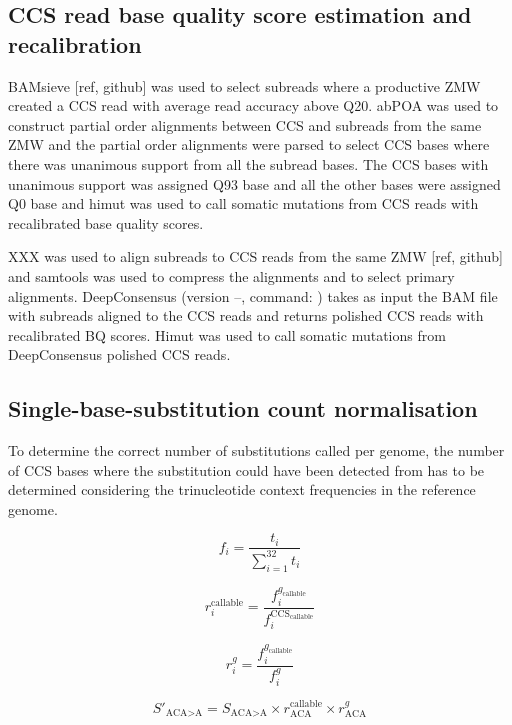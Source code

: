 \subsection{CCS read base quality score estimation and recalibration}

BAMsieve [ref, github] was used to select subreads where a productive ZMW created a CCS read with average read accuracy above Q20. abPOA \cite{Gao2021-nf} was used to construct partial order alignments between CCS and subreads from the same ZMW and the partial order alignments were parsed to select CCS bases where there was unanimous support from all the subread bases. The CCS bases with unanimous support was assigned Q93 base and all the other bases were assigned Q0 base and himut was used to call somatic mutations from CCS reads with recalibrated base quality scores. 

XXX was used to align subreads to CCS reads from the same ZMW [ref, github] and samtools was used to compress the alignments and to select primary alignments. DeepConsensus (version --, command: ) \cite{Baid2022-or} takes as input the BAM file with subreads aligned to the CCS reads and returns polished CCS reads with recalibrated BQ scores. Himut was used to call somatic mutations from DeepConsensus polished CCS reads. 

\subsection{Single-base-substitution count normalisation}
To determine the correct number of substitutions called per genome, the number of CCS bases where the substitution could have been detected from has to be determined considering the trinucleotide context frequencies in the reference genome.

\begin{equation}
f_{i} = \frac{t_{i}}{\sum^{32}_{i=1} t_{i}}
\end{equation}

\begin{equation}
r^{\text{callable}}_{i} = \frac{f^{g_{\text{callable}}}_{i}}{f^{\text{CCS}_{\text{callable}}}_{i}}
\end{equation}

\begin{equation}
r^{g}_{i} = \frac{f^{g_{\text{callable}}}_{i}}{f^{g}_{i}}
\end{equation}

\begin{equation}
S'_{\text{ACA>A}} = S_{\text{ACA>A}} \times r^{\text{callable}}_{\text{ACA}} \times r^{g}_{\text{ACA}}
\end{equation}

